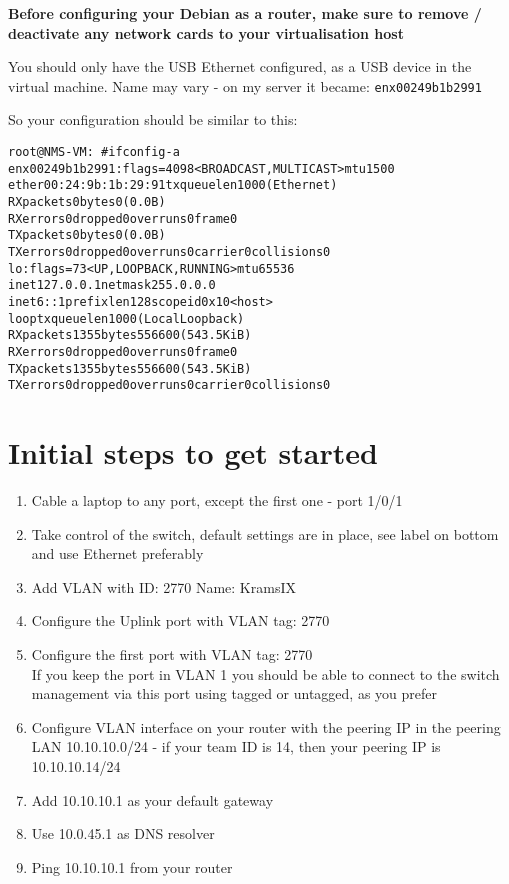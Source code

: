 \documentclass[a4paper,11pt,notitlepage]{report}
\begin{document}
{\bf Before configuring your Debian as a router, make sure to remove / deactivate any network cards to your virtualisation host}

You should only have the USB Ethernet configured, as a USB device in the virtual machine. Name may vary - on my server it became: \verb+enx00249b1b2991+

So your configuration should be similar to this:
\begin{alltt}
root@NMS-VM:~# ifconfig  -a
enx00249b1b2991: flags=4098<BROADCAST,MULTICAST>  mtu 1500
        ether 00:24:9b:1b:29:91  txqueuelen 1000  (Ethernet)
        RX packets 0  bytes 0 (0.0 B)
        RX errors 0  dropped 0  overruns 0  frame 0
        TX packets 0  bytes 0 (0.0 B)
        TX errors 0  dropped 0 overruns 0  carrier 0  collisions 0
lo: flags=73<UP,LOOPBACK,RUNNING>  mtu 65536
        inet 127.0.0.1  netmask 255.0.0.0
        inet6 ::1  prefixlen 128  scopeid 0x10<host>
        loop  txqueuelen 1000  (Local Loopback)
        RX packets 1355  bytes 556600 (543.5 KiB)
        RX errors 0  dropped 0  overruns 0  frame 0
        TX packets 1355  bytes 556600 (543.5 KiB)
        TX errors 0  dropped 0 overruns 0  carrier 0  collisions 0
\end{alltt}


\section*{Initial steps to get started}
\begin{enumerate}
\item Cable a laptop to any port, except the first one - port 1/0/1
\item Take control of the switch, default settings are in place, see label on bottom and use Ethernet preferably
\item Add VLAN with ID: 2770 Name: KramsIX
\item Configure the Uplink port with VLAN tag: 2770
\item Configure the first port with VLAN tag: 2770\\
If you keep the port in VLAN 1 you should be able to connect to the switch management via this port using tagged or untagged, as you prefer \smiley
\item Configure VLAN interface on your router with the peering IP in the peering LAN 10.10.10.0/24 - if your team ID is 14, then your peering IP is 10.10.10.14/24
\item Add 10.10.10.1 as your default gateway
\item Use 10.0.45.1 as DNS resolver
\item Ping 10.10.10.1 from your router
\end{enumerate}
\end{document}

